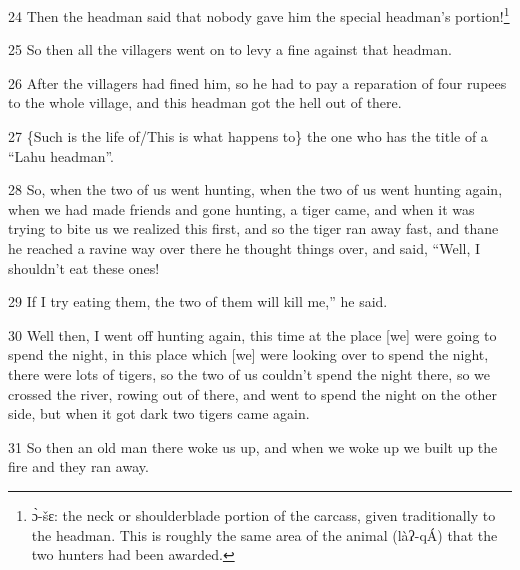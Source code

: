 24 Then the headman said that nobody gave him the special headman's portion!\footnote{ɔ̀-šɛ: the neck or shoulderblade portion of the carcass, given traditionally to the headman. This is roughly the same area of the animal (làʔ-qÁ) that the two hunters had been awarded.}

25 So then all the villagers went on to levy a fine against that headman.

26 After the villagers had fined him, so he had to pay a reparation of four rupees
to the whole village, and this headman got the hell out of there.

27 \{Such is the life of/This is what happens to\} the one who has the title of
a ``Lahu headman''.

28 So, when the two of us went hunting, when the two of us went hunting again,
when we had made friends and gone hunting, a tiger came, and when it was trying
to bite us we realized this first, and so the tiger ran away fast, and thane he
reached a ravine way over there he thought things over, and said, ``Well, I shouldn't
eat these ones!

29 If I try eating them, the two of them will kill me,'' he said.

30 Well then, I went off hunting again, this time at the place [we] were going
to spend the night, in this place which [we] were looking over to spend the night,
there were lots of tigers, so the two of us couldn't spend the night there, so
we crossed the river, rowing out of there, and went to spend the night on the other
side, but when it got dark two tigers came again.

31 So then an old man there woke us up, and when we woke up we built up the fire
and they ran away.

